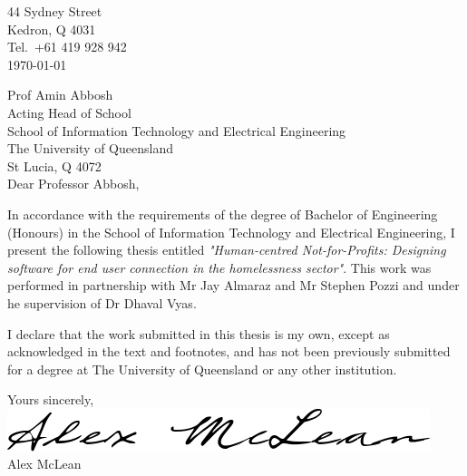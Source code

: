 \begin{flushright}
    44 Sydney Street\\
    Kedron, Q 4031\\
    Tel.\ +61 419 928 942\\
    \medskip
    \today
\end{flushright}
\begin{flushleft}
    Prof Amin Abbosh\\
    Acting Head of School\\
    School of Information Technology and Electrical Engineering\\
    The University of Queensland\\
    St Lucia, Q 4072\\
    \bigskip\bigskip
    Dear Professor Abbosh,
\end{flushleft}

In accordance with the requirements of the degree of Bachelor of Engineering (Honours) in the School of Information Technology and Electrical Engineering, I present the following thesis entitled \emph{"Human-centred Not-for-Profits: Designing software for end user connection in the homelessness sector"}. This work was performed in partnership with Mr Jay Almaraz and Mr Stephen Pozzi and under he supervision of Dr Dhaval Vyas.

I declare that the work submitted in this thesis is my own, except as acknowledged in the text and footnotes, and has not been previously submitted for a degree at The University of Queensland or any other institution.

\begin{flushright}
    Yours sincerely,\\
    \medskip
    \includegraphics[scale=0.4]{assets/sig.png}\\
    \medskip
    Alex McLean
\end{flushright}

\cleardoublepage